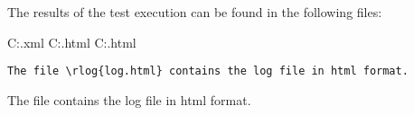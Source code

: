 \documentclass[a4paper,10pt]{report}
\begin{document}
\newpage

The results of the test execution can be found in the following files:
\begin{robotlog}
C:\RobotTest\testcases\output.xml
C:\RobotTest\testcases\log.html
C:\RobotTest\testcases\report.html
\end{robotlog}

\vspace{2ex}

\begin{verbatim}
The file \rlog{log.html} contains the log file in html format.
\end{verbatim}

The file  contains the log file in html format.

\end{document}
